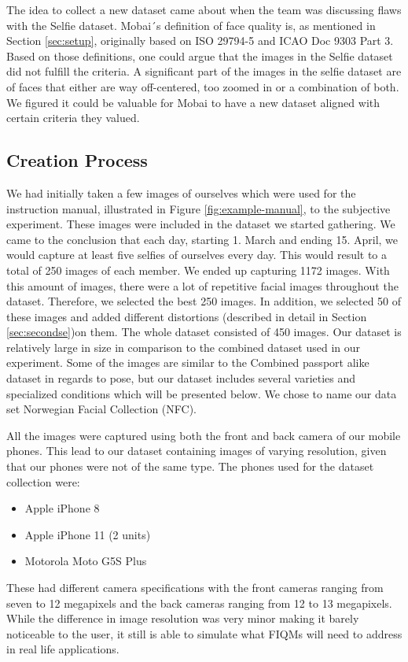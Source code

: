 The idea to collect a new dataset came about when the team was discussing flaws with the Selfie dataset. Mobai´s definition of face quality is, as mentioned in Section \ref{sec:setup}, originally based on ISO 29794-5 and ICAO Doc 9303 Part 3. Based on those definitions, one could argue that the images in the Selfie dataset did not fulfill the criteria. A significant part of the images in the selfie dataset are of faces that either are way off-centered, too zoomed in or a combination of both. We figured it could be valuable for Mobai to have a new dataset aligned with certain criteria they valued. 

\subsection*{Creation Process}
We had initially taken a few images of ourselves which were used for the instruction manual, illustrated in Figure \ref{fig:example-manual}, to the subjective experiment. These images were included in the dataset we started gathering. We came to the conclusion that each day, starting 1. March and ending 15. April, we would capture at least five selfies of ourselves every day. This would result to a total of 250 images of each member. We ended up capturing 1172 images. With this amount of images, there were a lot of repetitive facial images throughout the dataset. Therefore, we selected the best 250 images. In addition, we selected 50 of these images and added different distortions (described in detail in Section \ref{sec:secondse})on them. The whole dataset consisted of 450 images. Our dataset is relatively large in size in comparison to the combined dataset used in our experiment. Some of the images are similar to the Combined passport alike dataset in regards to pose, but our dataset includes several varieties and specialized conditions which will be presented below. We chose to name our data set Norwegian Facial Collection (NFC).

All the images were captured using both the front and back camera of our mobile phones. This lead to our dataset containing images of varying resolution, given that our phones were not of the same type. The phones used for the dataset collection were:
\begin{itemize}
    \item Apple iPhone 8 
    \item Apple iPhone 11 (2 units)
    \item Motorola Moto G5S Plus 
\end{itemize}
%
These had different camera specifications with the front cameras ranging from seven to 12 megapixels and the back cameras ranging from 12 to 13 megapixels. While the difference in image resolution was very minor making it barely noticeable to the user, it still is able to simulate what FIQMs will need to address in real life applications. 

